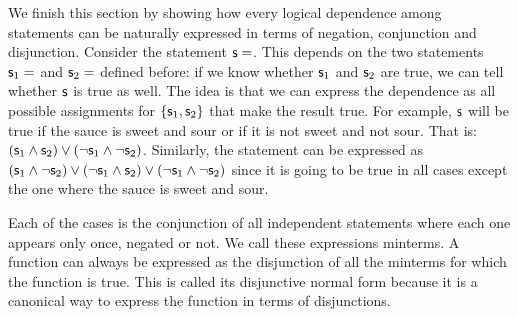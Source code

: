 	We finish this section by showing how every logical dependence among statements can be naturally expressed in terms of negation, conjunction and disjunction. Consider the statement $\mathsf{s}=$. This depends on the two statements $\mathsf{s}_1=$ and $\mathsf{s}_2=$ defined before: if we know whether $\mathsf{s}_1$ and $\mathsf{s}_2$ are true, we can tell whether $\mathsf{s}$ is true as well. The idea is that we can express the dependence as all possible assignments for $\{\mathsf{s}_1, \mathsf{s}_2 \}$ that make the result true. For example, $\mathsf{s}$ will be true if the sauce is sweet and sour or if it is not sweet and not sour. That is: $(\mathsf{s}_1 \wedge \mathsf{s}_2) \vee (\neg \mathsf{s}_1 \wedge \neg \mathsf{s}_2)$. Similarly, the statement  can be expressed as $(\mathsf{s}_1 \wedge \neg \mathsf{s}_2) \vee (\neg \mathsf{s}_1 \wedge \mathsf{s}_2) \vee (\neg \mathsf{s}_1 \wedge \neg \mathsf{s}_2)$ since it is going to be true in all cases except the one where the sauce is sweet and sour.
	
	
	Each of the cases is the conjunction of all independent statements where each one appears only once, negated or not. We call these expressions minterms. A function can always be expressed as the disjunction of all the minterms for which the function is true. This is called its disjunctive normal form because it is a canonical way to express the function in terms of disjunctions.
	
